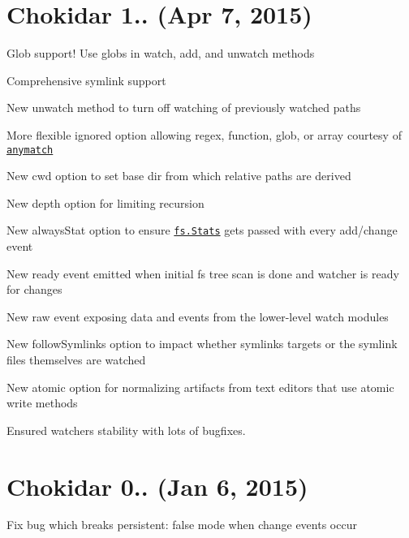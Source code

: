 \section*{Chokidar 1.. (Apr 7, 2015)}


\begin{DoxyItemize}
\item Glob support! Use globs in {\ttfamily watch}, {\ttfamily add}, and {\ttfamily unwatch} methods
\item Comprehensive symlink support
\item New {\ttfamily unwatch} method to turn off watching of previously watched paths
\item More flexible {\ttfamily ignored} option allowing regex, function, glob, or array courtesy of \href{https://github.com/es128/anymatch}{\tt anymatch}
\item New {\ttfamily cwd} option to set base dir from which relative paths are derived
\item New {\ttfamily depth} option for limiting recursion
\item New {\ttfamily always\+Stat} option to ensure \href{https://nodejs.org/api/fs.html#fs_class_fs_stats}{\tt {\ttfamily fs.\+Stats}} gets passed with every add/change event
\item New {\ttfamily ready} event emitted when initial fs tree scan is done and watcher is ready for changes
\item New {\ttfamily raw} event exposing data and events from the lower-\/level watch modules
\item New {\ttfamily follow\+Symlinks} option to impact whether symlinks\textquotesingle{} targets or the symlink files themselves are watched
\item New {\ttfamily atomic} option for normalizing artifacts from text editors that use atomic write methods
\item Ensured watcher\textquotesingle{}s stability with lots of bugfixes.
\end{DoxyItemize}

\section*{Chokidar 0.. (Jan 6, 2015)}


\begin{DoxyItemize}
\item Fix bug which breaks {\ttfamily persistent\+: false} mode when change events occur
\end{DoxyItemize}

